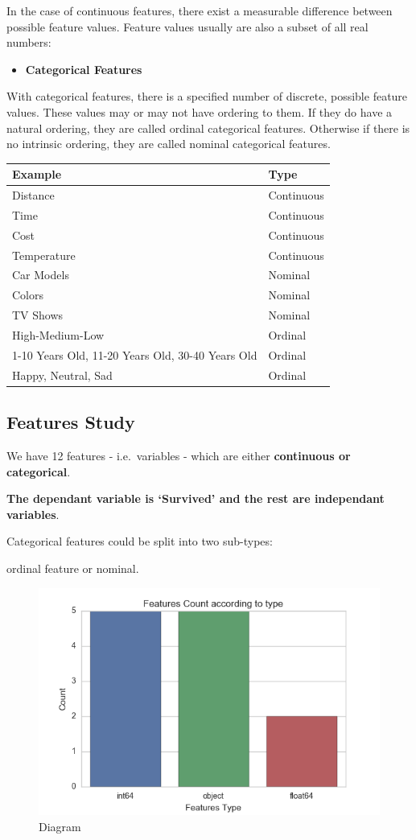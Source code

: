 \documentclass[11pt]{article}
\makeatletter
\def\maxwidth{\ifdim\Gin@nat@width>\linewidth\linewidth
    \else\Gin@nat@width\fi}
\let\Oldincludegraphics\includegraphics
\renewcommand{\includegraphics}[1]{\Oldincludegraphics[width=.8\maxwidth]{#1}}
\providecommand{\tightlist}{%
      \setlength{\itemsep}{0pt}\setlength{\parskip}{0pt}}
\makeatother
\begin{document}
In the case of continuous features, there exist a measurable difference
between possible feature values. Feature values usually are also a
subset of all real numbers:

\begin{itemize}
\tightlist
\item
  \textbf{Categorical Features}
\end{itemize}

With categorical features, there is a specified number of discrete,
possible feature values. These values may or may not have ordering to
them. If they do have a natural ordering, they are called ordinal
categorical features. Otherwise if there is no intrinsic ordering, they
are called nominal categorical features.

\begin{longtable}[]{@{}ll@{}}
\toprule
Example & Type\tabularnewline
\midrule
\endhead
Distance & Continuous\tabularnewline
Time & Continuous\tabularnewline
Cost & Continuous\tabularnewline
Temperature & Continuous\tabularnewline
Car Models & Nominal\tabularnewline
Colors & Nominal\tabularnewline
TV Shows & Nominal\tabularnewline
High-Medium-Low & Ordinal\tabularnewline
1-10 Years Old, 11-20 Years Old, 30-40 Years Old &
Ordinal\tabularnewline
Happy, Neutral, Sad & Ordinal\tabularnewline
\bottomrule
\end{longtable}

    \subsection{Features Study}\label{features-study}

We have 12 features - i.e.~variables - which are either
\textbf{continuous or categorical}.

\textbf{The dependant variable is `Survived' and the rest are
independant variables}.

Categorical features could be split into two sub-types:

ordinal feature or nominal.

    \begin{figure}
\centering
\includegraphics{TypeOfFeatures.png}
\caption{Diagram}
\end{figure}
\end{document}

